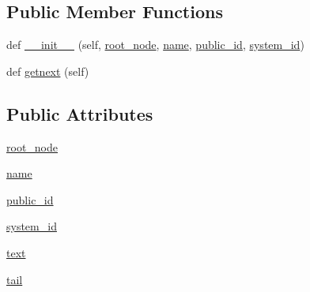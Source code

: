 \subsection*{Public Member Functions}
\begin{DoxyCompactItemize}
\item 
def \hyperlink{classpip_1_1__vendor_1_1html5lib_1_1treewalkers_1_1etree__lxml_1_1Doctype_a61ada2fbfe70c7684f67ed77115c0fa6}{\+\_\+\+\_\+init\+\_\+\+\_\+} (self, \hyperlink{classpip_1_1__vendor_1_1html5lib_1_1treewalkers_1_1etree__lxml_1_1Doctype_a3534ad461bf68add1fd54d23b420c549}{root\+\_\+node}, \hyperlink{classpip_1_1__vendor_1_1html5lib_1_1treewalkers_1_1etree__lxml_1_1Doctype_ae59d095fcae86000dfa738c9096ac910}{name}, \hyperlink{classpip_1_1__vendor_1_1html5lib_1_1treewalkers_1_1etree__lxml_1_1Doctype_ae3a2ad76894da76975510d632f577489}{public\+\_\+id}, \hyperlink{classpip_1_1__vendor_1_1html5lib_1_1treewalkers_1_1etree__lxml_1_1Doctype_abaa9113fe49404a50891eb428f8b78f6}{system\+\_\+id})
\item 
def \hyperlink{classpip_1_1__vendor_1_1html5lib_1_1treewalkers_1_1etree__lxml_1_1Doctype_a299f80a60a358284007509108443a5a1}{getnext} (self)
\end{DoxyCompactItemize}
\subsection*{Public Attributes}
\begin{DoxyCompactItemize}
\item 
\hyperlink{classpip_1_1__vendor_1_1html5lib_1_1treewalkers_1_1etree__lxml_1_1Doctype_a3534ad461bf68add1fd54d23b420c549}{root\+\_\+node}
\item 
\hyperlink{classpip_1_1__vendor_1_1html5lib_1_1treewalkers_1_1etree__lxml_1_1Doctype_ae59d095fcae86000dfa738c9096ac910}{name}
\item 
\hyperlink{classpip_1_1__vendor_1_1html5lib_1_1treewalkers_1_1etree__lxml_1_1Doctype_ae3a2ad76894da76975510d632f577489}{public\+\_\+id}
\item 
\hyperlink{classpip_1_1__vendor_1_1html5lib_1_1treewalkers_1_1etree__lxml_1_1Doctype_abaa9113fe49404a50891eb428f8b78f6}{system\+\_\+id}
\item 
\hyperlink{classpip_1_1__vendor_1_1html5lib_1_1treewalkers_1_1etree__lxml_1_1Doctype_a65c2a1cda3b344c36794b16050430f7b}{text}
\item 
\hyperlink{classpip_1_1__vendor_1_1html5lib_1_1treewalkers_1_1etree__lxml_1_1Doctype_aad94525c8b258b33c3a1ac2dc7f9fcb7}{tail}
\end{DoxyCompactItemize}


